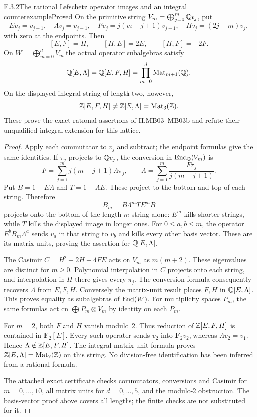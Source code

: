 \begin{result}{F.3.2}{The rational Lefschetz operator images and an integral counterexample}{Proved}
On the primitive string $V_m=\bigoplus_{j=0}^m\mathbb Q v_j$, put
\[
 Ev_j=v_{j+1},\quad \Lambda v_j=v_{j-1},\quad
 Fv_j=j(m-j+1)v_{j-1},\quad Hv_j=(2j-m)v_j,
\]
with zero at the endpoints. Then
\[
 [E,F]=H,\qquad[H,E]=2E,\qquad[H,F]=-2F.
\]
On $W=\bigoplus_{m=0}^dV_m$ the actual operator subalgebras satisfy
\[
 \mathbb Q[E,\Lambda]=\mathbb Q[E,F,H]
 =\prod_{m=0}^d\operatorname{Mat}_{m+1}(\mathbb Q).
\]
On the displayed integral string of length two, however,
\[
 \mathbb Z[E,F,H]\ne\mathbb Z[E,\Lambda]=\operatorname{Mat}_3(\mathbb Z).
\]
These prove the exact rational assertions of II.MB03--MB03b and refute their unqualified integral extension for this lattice.
\end{result}
\begin{proof}
Apply each commutator to $v_j$ and subtract; the endpoint formulas give the same identities. If $\pi_j$ projects to $\mathbb Q v_j$, the conversion in $\operatorname{End}_\mathbb Q(V_m)$ is
\[
 F=\sum_{j=1}^m j(m-j+1)\Lambda\pi_j,
 \qquad
 \Lambda=\sum_{j=1}^m\frac{F\pi_j}{j(m-j+1)}.
\]
Put $B=1-E\Lambda$ and $T=1-\Lambda E$. These project to the bottom and top of each string. Therefore
\[
 B_m=B\Lambda^mTE^mB
\]
projects onto the bottom of the length-$m$ string alone: $E^m$ kills shorter strings, while $T$ kills the displayed image in longer ones. For $0\leq a,b\leq m$, the operator $E^bB_m\Lambda^a$ sends $v_a$ in that string to $v_b$ and kills every other basis vector. These are its matrix units, proving the assertion for $\mathbb Q[E,\Lambda]$.

The Casimir $C=H^2+2H+4FE$ acts on $V_m$ as $m(m+2)$. These eigenvalues are distinct for $m\geq0$. Polynomial interpolation in $C$ projects onto each string, and interpolation in $H$ there gives every $\pi_j$. The conversion formula consequently recovers $\Lambda$ from $E,F,H$. Conversely the matrix-unit result places $F,H$ in $\mathbb Q[E,\Lambda]$. This proves equality as subalgebras of $\operatorname{End}(W)$. For multiplicity spaces $P_m$, the same formulas act on $\bigoplus P_m\otimes V_m$ by identity on each $P_m$.

For $m=2$, both $F$ and $H$ vanish modulo~2. Thus reduction of $\mathbb Z[E,F,H]$ is contained in $\mathbf F_2[E]$. Every such operator sends $v_2$ into $\mathbf F_2v_2$, whereas $\Lambda v_2=v_1$. Hence $\Lambda\notin\mathbb Z[E,F,H]$. The integral matrix-unit formula proves $\mathbb Z[E,\Lambda]=\operatorname{Mat}_3(\mathbb Z)$ on this string. No division-free identification has been inferred from a rational formula.

The attached exact certificate checks commutators, conversions and Casimir for $m=0,\ldots,10$, all matrix units for $d=0,\ldots,5$, and the modulo-2 obstruction. The basis-vector proof above covers all lengths; the finite checks are not substituted for it.
\end{proof}

